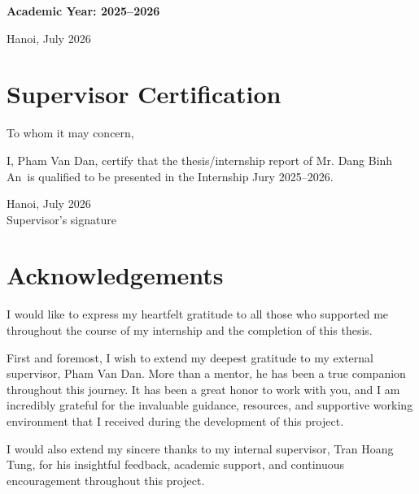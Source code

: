 \documentclass[12pt,a4paper]{report}
\newcommand{\studentname}{Dang Binh An}
\newcommand{\internalsupervisor}{Tran Hoang Tung}
\newcommand{\externalsupervisor}{Pham Van Dan}
\newcommand{\academicyear}{2025--2026}
\begin{document}
\begin{titlepage}
  \vfill

  {\large\bfseries Academic Year: \academicyear\par}
  \vspace{0.3cm}
  {\large Hanoi, July 2026\par}
  \vspace{0.5cm}
\end{titlepage}

\setcounter{page}{1}

\chapter*{Supervisor Certification}
To whom it may concern,

I, \externalsupervisor, certify that the thesis/internship report of Mr. \studentname\ is qualified to be presented in the Internship Jury \academicyear.

\vspace{1.5cm}
\begin{flushright}
  \begin{minipage}{0.4\textwidth}
    \centering
    Hanoi, July 2026 \\[1.5cm]
    Supervisor's signature
  \end{minipage}
\end{flushright}

\clearpage

\chapter*{Acknowledgements}
I would like to express my heartfelt gratitude to all those who supported me throughout the course of my internship and the completion of this thesis.

First and foremost, I wish to extend my deepest gratitude to my external supervisor, \externalsupervisor. More than a mentor, he has been a true companion throughout this journey. It has been a great honor to work with you, and I am incredibly grateful for the invaluable guidance, resources, and supportive working environment that I received during the development of this project.

I would also extend my sincere thanks to my internal supervisor, \internalsupervisor, for his insightful feedback, academic support, and continuous encouragement throughout this project.
\end{document}
